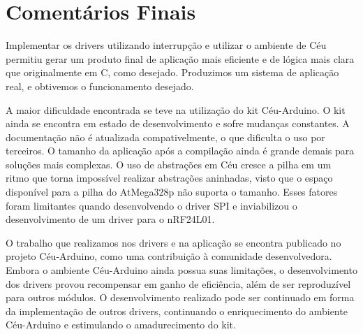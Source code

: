 \documentclass[11pt]{article}
\begin{document}
\section{Comentários Finais}
\tab Implementar os drivers utilizando interrupção e utilizar o ambiente de Céu permitiu gerar um produto final de aplicação mais eficiente e de lógica mais clara que originalmente em C, como desejado. Produzimos um sistema de aplicação real, e obtivemos o funcionamento desejado.
\par A maior dificuldade encontrada se teve na utilização do kit Céu-Arduino. O kit ainda se encontra em estado de desenvolvimento e sofre mudanças constantes. A documentação não é atualizada compativelmente, o que dificulta o uso por terceiros. O tamanho da aplicação após a compilação ainda é grande demais para soluções mais complexas. O uso de abstrações em Céu cresce a pilha em um ritmo que torna impossível realizar abstrações aninhadas, visto que o espaço disponível para a pilha do AtMega328p não suporta o tamanho. Esses fatores foram limitantes quando desenvolvendo o driver SPI e inviabilizou o desenvolvimento de um driver para o nRF24L01.
\par O trabalho que realizamos nos drivers e na aplicação se encontra publicado no projeto Céu-Arduino\cite{githubceuarduino}, como uma contribuição à comunidade desenvolvedora. Embora o ambiente Céu-Arduino ainda possua suas limitações, o desenvolvimento dos drivers provou recompensar em ganho de eficiência, além de ser reproduzível para outros módulos. O desenvolvimento realizado pode ser continuado em forma da implementação de outros drivers, continuando o enriquecimento do ambiente Céu-Arduino e estimulando o amadurecimento do kit.

\newpage

\printbibliography
\end{document}
